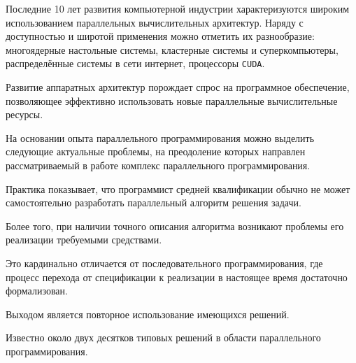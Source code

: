 


\date{21/IX/2011} %









\maketitle





Последние 10 лет развития компьютерной индустрии характеризуются широким использованием параллельных вычислительных архитектур. Наряду с доступностью и широтой применения можно отметить их разнообразие: многоядерные настольные системы, кластерные системы и суперкомпьютеры, распределённые системы в сети интернет, процессоры {\tt CUDA}. 

Развитие аппаратных архитектур порождает спрос на программное обеспечение, позволяющее эффективно использовать новые параллельные вычислительные ресурсы.



На основании опыта параллельного программирования можно выделить следующие актуальные проблемы, на преодоление которых направлен рассматриваемый в работе комплекс параллельного программирования.



Практика показывает, что программист средней квалификации обычно не может самостоятельно разработать параллельный алгоритм решения задачи. 

Более того, при наличии точного описания алгоритма возникают проблемы его реализации требуемыми средствами. 

Это кардинально отличается от последовательного программирования, где процесс перехода от спецификации к реализации в настоящее время достаточно формализован. 

Выходом является повторное использование имеющихся решений. 

Известно около двух десятков типовых решений в области параллельного программирования. 

